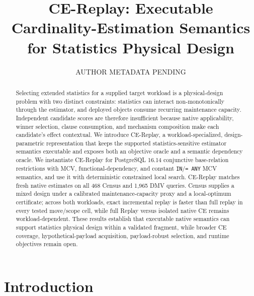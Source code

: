 \documentclass[sigconf,nonacm]{acmart}
\begin{document}
\title{CE-Replay: Executable Cardinality-Estimation Semantics for Statistics Physical Design}

\author{AUTHOR METADATA PENDING}

\begin{abstract}
Selecting extended statistics for a supplied target workload is a physical-design problem with two distinct constraints: statistics can interact non-monotonically through the estimator, and deployed objects consume recurring maintenance capacity. Independent candidate scores are therefore insufficient because native applicability, winner selection, clause consumption, and mechanism composition make each candidate's effect contextual. We introduce CE-Replay, a workload-specialized, design-parametric representation that keeps the supported statistics-sensitive estimator semantics executable and exposes both an objective oracle and a semantic dependency oracle. We instantiate CE-Replay for PostgreSQL 16.14 conjunctive base-relation restrictions with MCV, functional-dependency, and constant \texttt{IN}/\texttt{= ANY} MCV semantics, and use it with deterministic constrained local search. CE-Replay matches fresh native estimates on all 468 Census and 1,965 DMV queries. Census supplies a mixed design under a calibrated maintenance-capacity proxy and a local-optimum certificate; across both workloads, exact incremental replay is faster than full replay in every tested move/scope cell, while full Replay versus isolated native CE remains workload-dependent. These results establish that executable native semantics can support statistics physical design within a validated fragment, while broader CE coverage, hypothetical-payload acquisition, payload-robust selection, and runtime objectives remain open.
\end{abstract}
\maketitle

\vldbtopmatter

\section{Introduction}\label{sec:1}
\end{document}

